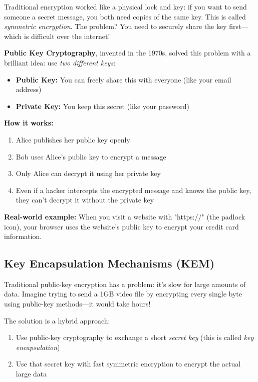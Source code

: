 \documentclass[12pt,a4paper]{report}
\begin{document}
Traditional encryption worked like a physical lock and key: if you want to send someone a secret message, you both need copies of the same key. This is called \textit{symmetric encryption}. The problem? You need to securely share the key first—which is difficult over the internet!

\textbf{Public Key Cryptography}, invented in the 1970s, solved this problem with a brilliant idea: use \textit{two different keys}:
\begin{itemize}
\item \textbf{Public Key:} You can freely share this with everyone (like your email address)
\item \textbf{Private Key:} You keep this secret (like your password)
\end{itemize}

\textbf{How it works:}
\begin{enumerate}
\item Alice publishes her public key openly
\item Bob uses Alice's public key to encrypt a message
\item Only Alice can decrypt it using her private key
\item Even if a hacker intercepts the encrypted message and knows the public key, they can't decrypt it without the private key
\end{enumerate}

\textbf{Real-world example:} When you visit a website with "https://" (the padlock icon), your browser uses the website's public key to encrypt your credit card information.

\subsection{Key Encapsulation Mechanisms (KEM)}

Traditional public-key encryption has a problem: it's slow for large amounts of data. Imagine trying to send a 1GB video file by encrypting every single byte using public-key methods—it would take hours!

The solution is a hybrid approach:
\begin{enumerate}
\item Use public-key cryptography to exchange a short \textit{secret key} (this is called \textit{key encapsulation})
\item Use that secret key with fast symmetric encryption to encrypt the actual large data
\end{enumerate}
\end{document}

